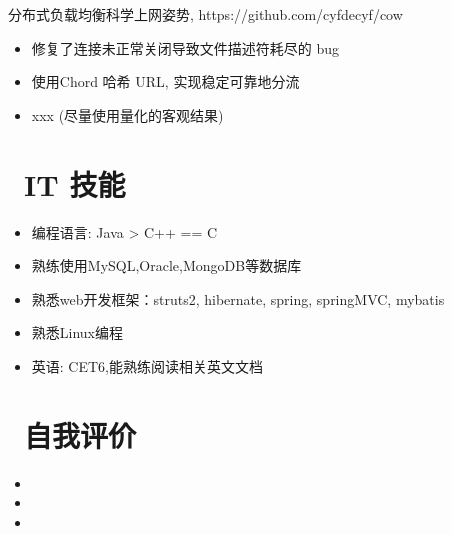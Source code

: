\documentclass{resume}
\begin{document}
\begin{onehalfspacing}
分布式负载均衡科学上网姿势, https://github.com/cyfdecyf/cow
\begin{itemize}
  \item 修复了连接未正常关闭导致文件描述符耗尽的 bug
  \item 使用Chord 哈希 URL, 实现稳定可靠地分流
  \item xxx (尽量使用量化的客观结果)
\end{itemize}
\end{onehalfspacing}


\section{\faCogs\ IT 技能}
\begin{itemize}[parsep=0.5ex]
  \item 编程语言: Java >  C++ == C 
  \item 熟练使用MySQL,Oracle,MongoDB等数据库
  \item 熟悉web开发框架：struts2, hibernate, spring, springMVC, mybatis
  \item 熟悉Linux编程
  \item 英语: CET6,能熟练阅读相关英文文档
\end{itemize}

\section{\faInfo\ 自我评价}
\begin{itemize}[parsep=0.5ex]
  \item 
  \item 
  \item 
\end{itemize}

%
%
\end{document}
